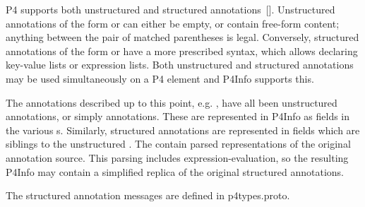 \documentclass[11pt]{article}
\begin{document}
{%
\noindent{}P4 supports both unstructured and structured annotations~[].
Unstructured annotations of the form  or  can
either be empty, or contain free-form content; anything between the pair of
matched parentheses is legal. Conversely, structured annotations of the form
 or  have a more prescribed syntax,
which allows declaring key-value lists or expression lists. Both unstructured
and structured annotations may be used simultaneously on a P4 element and
P4Info supports this.%

The annotations described up to this point, e.g. , have all been
unstructured annotations, or simply annotations. These are represented in
P4Info as  fields in the various s.
Similarly, structured annotations are represented in  fields which are siblings to the
unstructured . The  contain parsed
representations of the original annotation source. This parsing includes
expression-evaluation, so the resulting P4Info may contain a simplified
replica of the original structured annotations.%

The structured annotation messages are defined in p4types.proto.%

}
\end{document}
